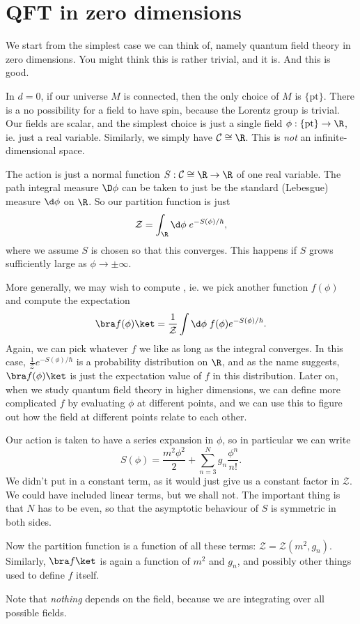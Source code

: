 \documentclass[a4paper]{article}
\begin{document}
\section{QFT in zero dimensions}
We start from the simplest case we can think of, namely quantum field theory in zero dimensions. You might think this is rather trivial, and it is. And this is good.

In $d = 0$, if our universe $M$ is connected, then the only choice of $M$ is $\{\mathrm{pt}\}$. There is a no possibility for a field to have spin, because the Lorentz group is trivial. Our fields are scalar, and the simplest choice is just a single field $\phi: \{\mathrm{pt}\} \to \R$, ie. just a real variable. Similarly, we simply have $\mathcal{C} \cong \R$. This is \emph{not} an infinite-dimensional space.

The action is just a normal function $S: \mathcal{C} \cong \R \to \R$ of one real variable. The path integral measure $\D \phi$ can be taken to just be the standard (Lebesgue) measure $\d \phi$ on $\R$. So our partition function is just
\[
  \mathcal{Z} = \int_\R \d \phi\; e^{-S(\phi)/\hbar},
\]
where we assume $S$ is chosen so that this converges. This happens if $S$ grows sufficiently large as $\phi \to \pm \infty$.

More generally, we may wish to compute , ie. we pick another function $f(\phi)$ and compute the expectation
\[
  \bra f(\phi)\ket = \frac{1}{\mathcal{Z}} \int \d \phi\; f(\phi) e^{-S(\phi)/\hbar}.
\]
Again, we can pick whatever $f$ we like as long as the integral converges. In this case, $\frac{1}{\mathcal{Z}} e^{-S(\phi)/\hbar}$ is a probability distribution on $\R$, and as the name suggests, $\bra f(\phi)\ket$ is just the expectation value of $f$ in this distribution. Later on, when we study quantum field theory in higher dimensions, we can define more complicated $f$ by evaluating $\phi$ at different points, and we can use this to figure out how the field at different points relate to each other.

Our action is taken to have a series expansion in $\phi$, so in particular we can write
\[
  S(\phi) = \frac{m^2 \phi^2}{2} + \sum_{n = 3}^N g_n \frac{\phi^n}{n!}.
\]
We didn't put in a constant term, as it would just give us a constant factor in $\mathcal{Z}$. We could have included linear terms, but we shall not. The important thing is that $N$ has to be even, so that the asymptotic behaviour of $S$ is symmetric in both sides.

Now the partition function is a function of all these terms: $\mathcal{Z} = \mathcal{Z}(m^2, g_n)$. Similarly, $\bra f\ket$ is again a function of $m^2$ and $g_n$, and possibly other things used to define $f$ itself.

Note that \emph{nothing} depends on the field, because we are integrating over all possible fields.

\printindex
\end{document}
